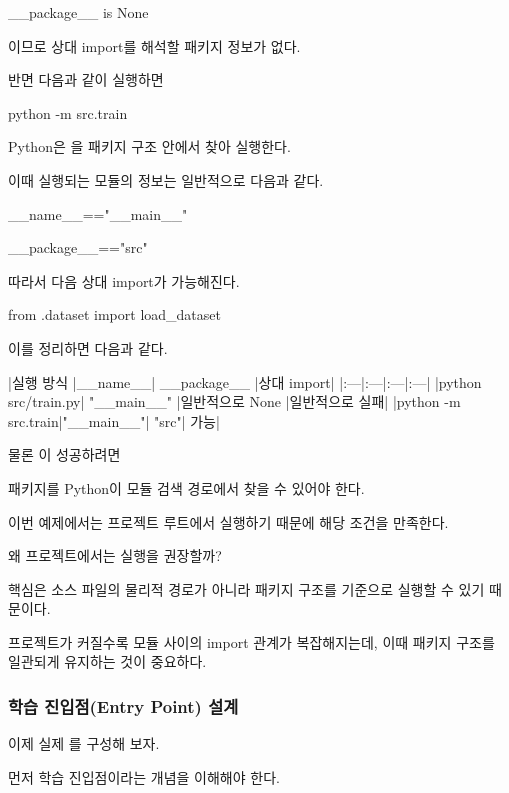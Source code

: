 \begin{dhkzsh}
__package__ is None
\end{dhkzsh}

이므로 상대 import를 해석할 패키지 정보가 없다.

반면 다음과 같이 실행하면

\begin{dhkzsh}
python -m src.train
\end{dhkzsh}

Python은 을 패키지 구조 안에서 찾아 실행한다.

이때 실행되는 모듈의 정보는 일반적으로 다음과 같다.

\begin{dhkzsh}
__name__=="__main__"

__package__=="src"
\end{dhkzsh}

따라서 다음 상대 import가 가능해진다.

\begin{dhkcode}
from .dataset import load_dataset
\end{dhkcode}

이를 정리하면 다음과 같다.

\begin{dhktable}
|실행 방식	|__name__|	__package__	|상대 import|
|:---|:---|:---|:---|
|python src/train.py|	"__main__"	|일반적으로 None	|일반적으로 실패|
|python -m src.train|"__main__"|	"src"|	가능|
\end{dhktable}

물론 이 성공하려면 

 패키지를 Python이 모듈 검색 경로에서 찾을 수 있어야 한다.

이번 예제에서는 프로젝트 루트에서 실행하기 때문에 해당 조건을 만족한다.

왜 프로젝트에서는  실행을 권장할까?

핵심은 소스 파일의 물리적 경로가 아니라 패키지 구조를 기준으로 실행할 수 있기 때문이다.

프로젝트가 커질수록 모듈 사이의 import 관계가 복잡해지는데, 이때 패키지 구조를 일관되게 유지하는 것이 중요하다.

\subsubsection{학습 진입점(Entry Point) 설계}

이제 실제 를 구성해 보자.

먼저 학습 진입점이라는 개념을 이해해야 한다.

